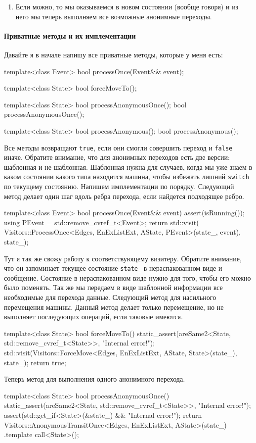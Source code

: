 \documentclass{article}
\begin{document}
{\begin{enumerate}
\item Если можно, то мы оказываемся в новом состоянии (вообще говоря) и из него мы теперь выполняем все возможные анонимные переходы.
\end{enumerate}

\paragraph{Приватные методы и их имплементации}

Давайте я в начале напишу все приватные методы, которые у меня есть:
\begin{cppcode}
template<class Event>
bool processOnce(Event&& event);

template<class State>
bool forceMoveTo();

template<class State>
bool processAnonymousOnce();
bool processAnonymousOnce();

template<class State>
bool processAnonymous();
bool processAnonymous();
\end{cppcode}
Все методы возвращают \verb"true", если они смогли совершить переход и \verb"false" иначе.
Обратите внимание, что для анонимных переходов есть две версии: шаблонная и не шаблонная.
Шаблонная нужна для случаев, когда мы уже знаем в каком состоянии какого типа находится машина, чтобы избежать лишний \verb"switch" по текущему состоянию.
Напишем имплементации по порядку.
Следующий метод делает один шаг вдоль ребра перехода, если найдется подходящее ребро.
\begin{cppcode}
template<class Event>
bool processOnce(Event&& event) {
  assert(isRunning());
  using PEvent = std::remove_cvref_t<Event>;
  return std::visit(
             Visitors::ProcessOnce<Edges, EnExListExt, AState, PEvent>(state_, event), state_);
}
\end{cppcode}
Тут я так же свожу работу к соответствующему визитеру.
Обратите внимание, что он запоминает текущее состояние \verb"state_" в нераспакованном виде и сообщение.
Состояние в нераспакованном виде нужно для того, чтобы его можно было поменять.
Так же мы передаем в виде шаблонной информации все необходимые для перехода данные.
Следующий метод для насильного перемещения машины.
Данный метод делает только перемещение, но не выполняет последующих операций, если таковые имеются.
\begin{cppcode}
template<class State>
bool forceMoveTo() {
  static_assert(areSame2<State, std::remove_cvref_t<State>>, "Internal error!");
  std::visit(Visitors::ForceMove<Edges, EnExListExt, AState, State>(state_), state_);
  return true;
}
\end{cppcode}
Теперь метод для выполнения одного анонимного перехода.
\begin{cppcode}
template<class State>
bool processAnonymousOnce() {
  static_assert(areSame2<State, std::remove_cvref_t<State>>, "Internal error!");
  assert(std::get_if<State>(&state_) && "Internal error!");
    return Visitors::AnonymousTransitOnce<Edges, EnExListExt, AState>(state_)
        .template call<State>();
}


\end{cppcode}}
\end{document}
